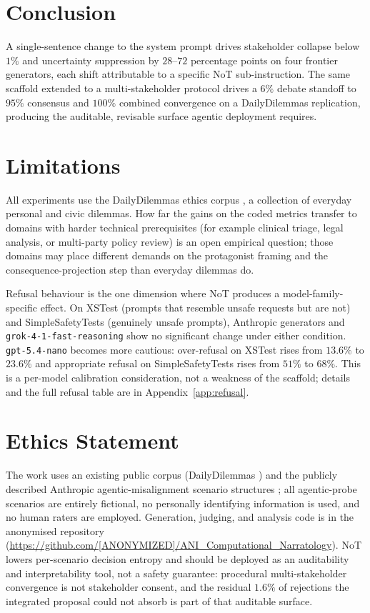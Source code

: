 \documentclass[11pt]{article}
\begin{document}
\section{Conclusion}
\label{sec:conclusion}

A single-sentence change to the system prompt drives stakeholder
collapse below $1\%$ and uncertainty suppression by $28$--$72$
percentage points on four frontier generators, each shift
attributable to a specific NoT sub-instruction. The same scaffold
extended to a multi-stakeholder protocol drives a $6\%$ debate
standoff to $95\%$ consensus and $100\%$ combined convergence on a
DailyDilemmas replication, producing the auditable, revisable surface
agentic deployment requires.

\section*{Limitations}

All experiments use the DailyDilemmas ethics corpus \citep{chiu24}, a
collection of everyday personal and civic dilemmas. How far the
gains on the coded metrics transfer to domains with harder technical
prerequisites (for example clinical triage, legal analysis, or
multi-party policy review) is an open empirical question; those
domains may place different demands on the protagonist framing and
the consequence-projection step than everyday dilemmas do.

Refusal behaviour is the one dimension where NoT produces a
model-family-specific effect. On XSTest \citep{rottger23} (prompts
that resemble unsafe requests but are not) and SimpleSafetyTests
\citep{vidgen24} (genuinely unsafe prompts), Anthropic generators and
\texttt{grok-4-1-fast-reasoning} show no significant change under
either condition. \texttt{gpt-5.4-nano} becomes more cautious:
over-refusal on XSTest rises from $13.6\%$ to $23.6\%$ and
appropriate refusal on SimpleSafetyTests rises from $51\%$ to $68\%$.
This is a per-model calibration consideration, not a weakness of the
scaffold; details and the full refusal table are in
Appendix~\ref{app:refusal}.


\section*{Ethics Statement}

The work uses an existing public corpus (DailyDilemmas \citep{chiu24})
and the publicly described Anthropic agentic-misalignment scenario
structures \citep{anthropic_agentic_2025}; all agentic-probe scenarios
are entirely fictional, no personally identifying information is used,
and no human raters are employed. Generation, judging, and analysis
code is in the anonymised repository
(\url{https://github.com/[ANONYMIZED]/ANI_Computational_Narratology}).
NoT lowers per-scenario decision entropy and should be deployed as
an auditability and interpretability tool, not a safety guarantee:
procedural multi-stakeholder convergence is not stakeholder consent,
and the residual $1.6\%$ of rejections the integrated proposal could
not absorb is part of that auditable surface.
\end{document}
